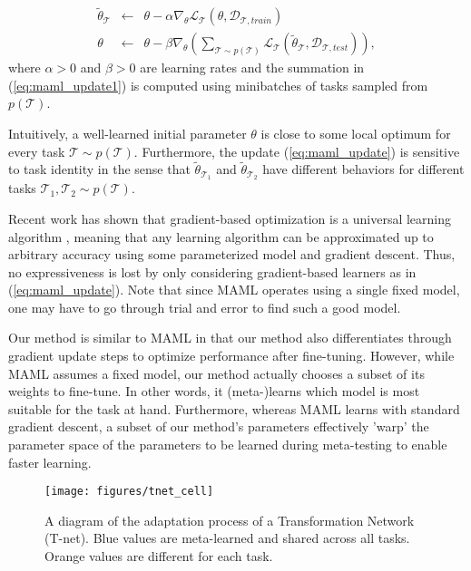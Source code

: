 \documentclass{article}
\newcommand{\calD}{{\mathcal{D}}}
\newcommand{\calT}{{\mathcal{T}}}
\newcommand{\0}{{\bf 0}}
\newcommand{\be}{\begin{eqnarray}}
\newcommand{\ee}{\end{eqnarray}}
\newcommand{\loss}{\mathcal{L}_{\calT}}
\begin{document}
\be
\label{eq:maml_update}
\widetilde{\theta}_\calT &\leftarrow& \theta - \alpha \nabla_\theta \loss \left(\theta, \calD_{\calT,train} \right) \\
\theta &\leftarrow& \theta - \beta \nabla_{\theta}
\label{eq:maml_update1}
\left( \sum_{\calT \sim p(\calT)} \loss \left(\widetilde{\theta}_{\calT}, \calD_{\calT,test} \right) \right),
\ee
where $\alpha > 0$ and $\beta > 0$ are learning rates and 
the summation in (\ref{eq:maml_update1}) is computed using minibatches of tasks sampled from $p(\calT)$.

Intuitively, a well-learned initial parameter $\theta$ is close to some local optimum for every task $\calT \sim p(\calT)$.
Furthermore, the update (\ref{eq:maml_update}) is sensitive to task identity in the sense that $\widetilde{\theta}_{\calT_1}$ and $\widetilde{\theta}_{\calT_2}$
have different behaviors for different tasks $\calT_1, \calT_2 \sim p(\calT)$.

Recent work has shown that gradient-based optimization is a universal learning algorithm \cite{FinnC2017arxiv}, 
meaning that any learning algorithm can be approximated up to arbitrary accuracy using some parameterized model and gradient descent.
Thus, no expressiveness is lost by only considering gradient-based learners as in (\ref{eq:maml_update}). 
Note that since MAML operates using a single fixed model, one may have to go through trial and error to find such a good model.

Our method is similar to MAML in that our method also differentiates through gradient update steps to optimize performance after fine-tuning.
However, while MAML assumes a fixed model, our method actually chooses a subset of its weights to fine-tune.
In other words, it (meta-)learns which model is most suitable for the task at hand.
Furthermore, whereas MAML learns with standard gradient descent, a subset of our method's parameters effectively 'warp' the parameter space of the parameters to be learned during meta-testing to enable faster learning.







\begin{figure}[ht!]
\centering\texttt{[image: figures/tnet\_cell]}
\caption{A diagram of the adaptation process of a Transformation Network (T-net).
Blue values are meta-learned and shared across all tasks. 
Orange values are different for each task.}
\end{figure}
\end{document}
